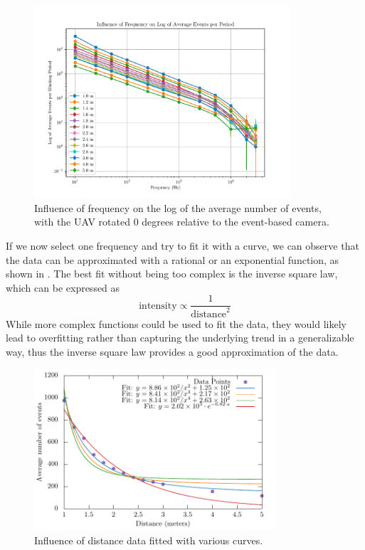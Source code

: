 \begin{figure}[H]
    \centering
    \includegraphics[width=0.85\textwidth]{./fig/semestral/freqlog.pdf}
    \caption{
        Influence of frequency on the log of the average number of events, with the UAV rotated 0 degrees relative to the event-based camera.
    }
    \label{fig:freqs}
\end{figure}
If we now select one frequency and try to fit it with a curve,
we can observe that the data can be approximated with a rational or an exponential function, as shown in .
The best fit without being too complex is the inverse square law, which can be expressed as
\begin{equation}
	\text{intensity} \propto \frac{1}{\text{distance}^2}
\end{equation}
While more complex functions could be used to fit the data, they would likely lead to overfitting rather than capturing the underlying trend in a generalizable way, thus the inverse square law provides a good approximation of the data.
\begin{figure}[H]
	\centering
	\includegraphics[width=0.80\textwidth]{./fig/semestral/inverse_square/square.pdf}
	\caption{Influence of distance data fitted with various curves.}
	\label{fig:fit1}
\end{figure}

